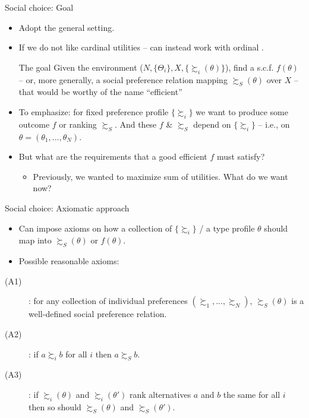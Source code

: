 \documentclass[english,10pt
,aspectratio=169
]{beamer}
\begin{document}
\begin{frame}{Social choice: Goal}
\begin{itemize}
	\item Adopt the \alert{general} setting.
	\item If we do not like cardinal utilities -- can instead work with ordinal .
	\begin{exampleblock}{The goal}
		Given the environment ($N,\{\Theta_i\},X,\{\succsim_i(\theta)\}$), find a s.c.f. $f(\theta)$ -- or, more generally, a social preference relation mapping $\succsim_S(\theta)$ over $X$ -- that would be worthy of the name ``efficient''
	\end{exampleblock}
	\item To emphasize: for  fixed preference profile $\{\succsim_i \}$ we want to produce some outcome $f$ or ranking $\succsim_S$. And these $f$ \& $\succsim_S$  depend on $\{\succsim_i \}$ -- i.e., on $\theta=(\theta_1,...,\theta_N)$.
	\item But what are the requirements that a good efficient $f$ must satisfy?
	\begin{itemize}
		\item Previously, we wanted to maximize sum of utilities. What do we want now?
	\end{itemize}
\end{itemize}
\end{frame}


\begin{frame}{Social choice: Axiomatic approach}
	\begin{itemize}
		\item Can impose \alert{axioms} on how a collection of $\{\succsim_i\}$ / a type profile $\theta$ should map into $\succsim_S(\theta)$ or $f(\theta)$.
		\item Possible reasonable axioms:
	\end{itemize}
	\begin{description}
		\item[(A1)] : for any collection of individual preferences $\left(\succsim_1, ..., \succsim_N \right)$, $\succsim_S(\theta)$ is a well-defined social preference relation.
		\item[(A2)] : if $a \succsim_i b$ for all $i$ then $a \succsim_S b$.
		\item[(A3)] : if $\succsim_i(\theta)$ and $\succsim_i(\theta')$ rank alternatives $a$ and $b$ the same for all $i$ then so should $\succsim_S(\theta)$ and $\succsim_S(\theta')$.
	\end{description}
\end{frame}
\end{document}
